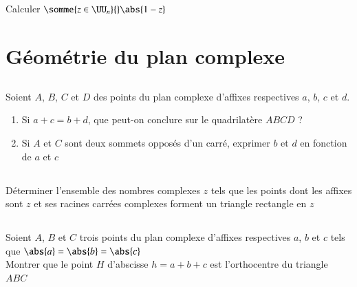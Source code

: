 \documentclass[oneside,12pt]{article}
\begin{document}
\subsection{}
Calculer $\somme{z\in\UU_n}{}\abs{1-z}$

\section{Géométrie du plan complexe}

\subsection{}
Soient $A$, $B$, $C$ et $D$ des points du plan complexe d'affixes respectives $a$, $b$, $c$ et $d$.
\begin{enumerate}
	\item Si $a+c=b+d$, que peut-on conclure sur le quadrilatère $ABCD$ ?
	\item Si $A$ et $C$ sont deux sommets opposés d'un carré, exprimer $b$ et $d$ en fonction de $a$ et $c$
\end{enumerate}

\subsection{}
Déterminer l'ensemble des nombres complexes $z$ tels que les points dont les affixes sont $z$ et ses racines carrées complexes forment un triangle rectangle en $z$

\subsection{}
Soient $A$, $B$ et $C$ trois points du plan complexe d'affixes respectives $a$, $b$ et $c$ tels que $\abs{a}=\abs{b}=\abs{c}$ \\
Montrer que le point $H$ d'abscisse $h=a+b+c$ est l'orthocentre du triangle $ABC$
\end{document}
